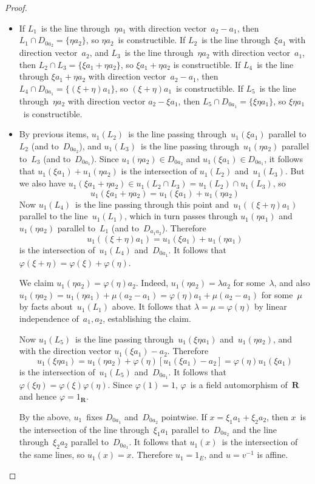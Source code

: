 \documentclass[letterpaper,12pt]{article}
\newcommand{\R}{\mathbf{R}}
\newcommand{\sect}{\cap}
\newcommand{\inv}[1]{#1^{-1}}
\theoremstyle{definition}
\theoremstyle{remark}
\begin{document}
\begin{proof}
\begin{itemize}[itemsep=0pt]
\item If \(L_1\)~is the line through~\(\eta a_1\) with direction vector~\(a_2-a_1\), then \(L_1\sect D_{0a_2}=\{\eta a_2\}\), so \(\eta a_2\)~is constructible. If \(L_2\)~is the line through~\(\xi a_1\) with direction vector~\(a_2\), and \(L_3\)~is the line through~\(\eta a_2\) with direction vector~\(a_1\), then \(L_2\sect L_3=\{\xi a_1+\eta a_2\}\), so \(\xi a_1+\eta a_2\) is constructible. If \(L_4\)~is the line through \(\xi a_1+\eta a_2\) with direction vector~\(a_2-a_1\), then \(L_4\sect D_{0a_1}=\{(\xi+\eta)a_1\}\), so \((\xi+\eta)a_1\)~is constructible. If \(L_5\)~is the line through~\(\eta a_2\) with direction vector \(a_2-\xi a_1\), then \(L_5\sect D_{0a_1}=\{\xi\eta a_1\}\), so \(\xi\eta a_1\)~is constructible.

\item By previous items, \(u_1(L_2)\)~is the line passing through~\(u_1(\xi a_1)\) parallel to~\(L_2\) (and to~\(D_{0a_2}\)), and \(u_1(L_3)\)~is the line passing through~\(u_1(\eta a_2)\) parallel to~\(L_3\) (and to~\(D_{0a_1}\)). Since \(u_1(\eta a_2)\in D_{0a_2}\) and \(u_1(\xi a_1)\in D_{0a_1}\), it follows that \(u_1(\xi a_1)+u_1(\eta a_2)\) is the intersection of \(u_1(L_2)\) and~\(u_1(L_3)\). But we also have \(u_1(\xi a_1+\eta a_2)\in u_1(L_2\sect L_3)=u_1(L_2)\sect u_1(L_3)\), so
\[u_1(\xi a_1+\eta a_2)=u_1(\xi a_1)+u_1(\eta a_2)\]
Now \(u_1(L_4)\)~is the line passing through this point and~\(u_1((\xi+\eta)a_1)\) parallel to the line~\(u_1(L_1)\), which in turn passes through \(u_1(\eta a_1)\) and~\(u_1(\eta a_2)\) parallel to~\(L_1\) (and to~\(D_{a_1a_2}\)). Therefore
\[u_1((\xi+\eta)a_1)=u_1(\xi a_1)+u_1(\eta a_1)\]
is the intersection of~\(u_1(L_4)\) and~\(D_{0a_1}\). It follows that \(\varphi(\xi+\eta)=\varphi(\xi)+\varphi(\eta)\).

We claim \(u_1(\eta a_2)=\varphi(\eta)a_2\). Indeed, \(u_1(\eta a_2)=\lambda a_2\) for some~\(\lambda\), and also \(u_1(\eta a_2)=u_1(\eta a_1)+\mu(a_2-a_1)=\varphi(\eta)a_1+\mu(a_2-a_1)\) for some~\(\mu\) by facts about~\(u_1(L_1)\) above. It follows that \(\lambda=\mu=\varphi(\eta)\) by linear independence of~\(a_1,a_2\), establishing the claim.

Now \(u_1(L_5)\)~is the line passing through~\(u_1(\xi\eta a_1)\) and~\(u_1(\eta a_2)\), and with the direction vector \(u_1(\xi a_1)-a_2\). Therefore
\[u_1(\xi\eta a_1)=u_1(\eta a_2)+\varphi(\eta)[u_1(\xi a_1)-a_2]=\varphi(\eta)u_1(\xi a_1)\]
is the intersection of~\(u_1(L_5)\) and~\(D_{0a_1}\). It follows that \(\varphi(\xi\eta)=\varphi(\xi)\varphi(\eta)\). Since \(\varphi(1)=1\), \(\varphi\)~is a field automorphism of~\(\R\) and hence \(\varphi=1_{\R}\).

By the above, \(u_1\)~fixes \(D_{0a_1}\) and~\(D_{0a_2}\) pointwise. If \(x=\xi_1 a_1+\xi_2 a_2\), then \(x\)~is the intersection of the line through~\(\xi_1 a_1\) parallel to~\(D_{0a_2}\) and the line through~\(\xi_2 a_2\) parallel to~\(D_{0a_1}\). It follows that \(u_1(x)\)~is the intersection of the same lines, so \(u_1(x)=x\). Therefore \(u_1=1_E\), and \(u=\inv{v}\) is affine.\qedhere
\end{itemize}
\end{proof}
\end{document}
